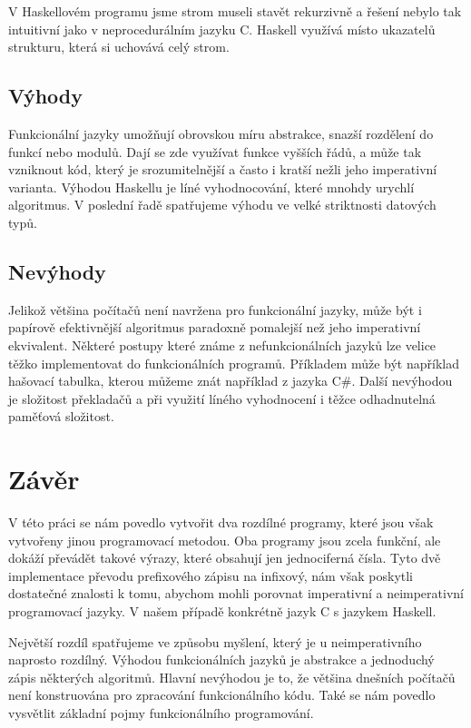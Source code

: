 \documentclass[12pt,a4paper]{report}
\begin{document}
V Haskellovém programu jsme strom museli stavět rekurzivně a řešení nebylo tak intuitivní jako v neprocedurálním jazyku C. Haskell využívá místo ukazatelů strukturu, která si uchovává celý strom.  

\section{Výhody}
Funkcionální jazyky umožňují obrovskou míru abstrakce, snazší rozdělení do funkcí nebo modulů. Dají se zde využívat funkce vyšších řádů, a může tak vzniknout kód, který je srozumitelnější a často i kratší nežli jeho imperativní varianta. Výhodou Haskellu je líné vyhodnocování, které mnohdy urychlí algoritmus. V poslední řadě spatřujeme výhodu ve velké striktnosti datových typů.
\section{Nevýhody}
Jelikož většina počítačů není navržena pro funkcionální jazyky, může být i papírově efektivnější algoritmus paradoxně pomalejší než jeho imperativní ekvivalent. Některé postupy které známe z nefunkcionálních jazyků lze velice těžko implementovat do funkcionálních programů. Příkladem může být například hašovací tabulka, kterou můžeme znát například z jazyka C\#. 
Další nevýhodou je složitost překladačů a při využití líného vyhodnocení i těžce odhadnutelná paměťová složitost.

\chapter{Závěr}
V této práci se nám povedlo vytvořit dva rozdílné programy, které jsou však vytvořeny jinou programovací metodou. Oba programy jsou zcela funkční, ale dokáží převádět takové výrazy, které obsahují jen jednociferná čísla. Tyto dvě implementace převodu prefixového zápisu na infixový, nám však poskytli dostatečné znalosti k tomu, abychom mohli porovnat imperativní a neimperativní programovací jazyky. V našem případě konkrétně jazyk C s jazykem Haskell. 

Největší rozdíl spatřujeme ve způsobu myšlení, který je u neimperativního naprosto rozdílný. Výhodou funkcionálních jazyků je abstrakce a jednoduchý zápis některých algoritmů. Hlavní nevýhodou je to, že většina dnešních počítačů není konstruována pro zpracování funkcionálního kódu. Také se nám povedlo vysvětlit základní pojmy funkcionálního programování. 
\end{document}
